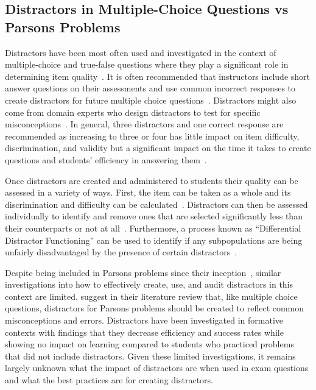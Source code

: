 \documentclass[authorversion,nonacm]{acmart}
\begin{document}
\subsection{Distractors in Multiple-Choice Questions vs Parsons Problems}

Distractors have been most often used and investigated in the context of
multiple-choice and true-false questions where they play a significant role in
determining item quality~\cite{gierl2017developing}. It is often recommended
that instructors include short answer questions on their assessments and use
common incorrect responses to create distractors for future multiple choice
questions~\cite{briggs2006diagnostic}.  Distractors might also come from domain
experts who design distractors to test for specific
misconceptions~\cite{guttman1967systematic}. In general, three distractors and one correct response are
recommended as increasing to three or four has little impact on item difficulty,
discrimination, and validity but a significant impact on the time it takes to
create questions and students' efficiency in answering them~\cite{vyas2008multiple}.

Once distractors are created and administered to students their quality can be
assessed in a variety of ways. First, the item can be taken as a whole and its
discrimination and difficulty can be calculated~\cite{mahjabeen2017difficulty}.
Distractors can then be assessed individually to identify and remove ones that
are selected significantly less than their counterparts or not at
all~\cite{tarrant2009assessment}.  Furthermore, a process known as
``Differential Distractor Functioning'' can be used to identify if any
subpopulations are being unfairly disadvantaged by the presence of certain
distractors~\cite{green1989method}.

Despite being included in Parsons problems since their
inception~\cite{parsons2006parson}, similar investigations into how to
effectively create, use, and audit distractors in this context
are limited. \citet{du2020review} suggest in their literature review that, like
multiple choice questions, distractors for Parsons problems should be created to
reflect common misconceptions and errors. Distractors have been investigated in
formative contexts with \citet{harms2016distractors} findings that they decrease
efficiency and success rates while showing no impact on learning compared to
students who practiced problems that did not include distractors. Given these
limited investigations, it remains largely unknown what the impact of distractors
are when used in exam questions and what the best practices are for creating
distractors.
\end{document}
